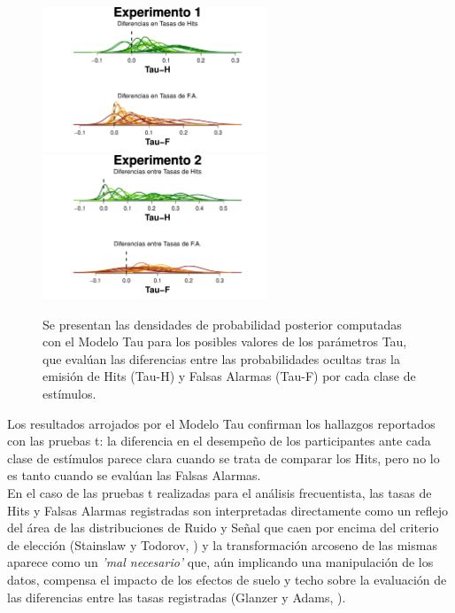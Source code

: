 \begin{figure}[th]
\centering
\includegraphics[width=0.6\textwidth]{Figures/MTau_DensidadTau_E1} \\ 
\includegraphics[width=0.6\textwidth]{Figures/MTau_DensidadTau_E2}\\
\caption[Modelo Tau: Densidad de probabilidad posterior para los posibles valores de los parámetros Tau]{Se presentan las densidades de probabilidad posterior computadas con el Modelo Tau para los posibles valores de los parámetros Tau, que evalúan las diferencias entre las probabilidades ocultas tras la emisión de Hits (Tau-H) y Falsas Alarmas (Tau-F) por cada clase de estímulos.}
\label{fig:Tau}
\end{figure}

Los resultados arrojados por el Modelo Tau confirman los hallazgos reportados con las pruebas t: la diferencia en el desempeño de los participantes ante cada clase de estímulos parece clara cuando se trata de comparar los Hits, pero no lo es tanto cuando se evalúan las Falsas Alarmas.\\

En el caso de las pruebas t realizadas para el análisis frecuentista, las tasas de Hits y Falsas Alarmas registradas son interpretadas directamente como un reflejo del área de las distribuciones de Ruido y Señal que caen por encima del criterio de elección (Stainslaw y Todorov, \citeyear{Stainslaw1999}) y la transformación arcoseno de las mismas aparece como un \textit{'mal necesario'} que, aún implicando una manipulación de los datos, compensa el impacto de los efectos de suelo y techo sobre la evaluación de las diferencias entre las tasas registradas (Glanzer y Adams, \citeyear{Glanzer1990}). \\ 

